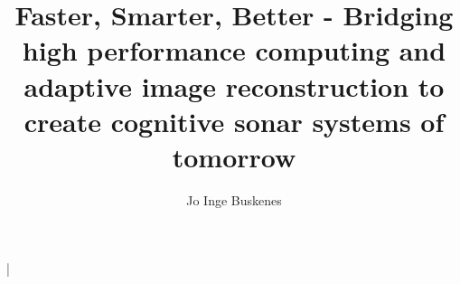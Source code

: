 %


\title{Faster, Smarter, Better - Bridging high performance computing and adaptive image reconstruction to create cognitive sonar systems of tomorrow}
\author{Jo Inge Buskenes}





\makeglossaries



%
%


\frontmatter
\maketitle

%   
%   

|
\printglossary 


\mainmatter
% 
%     
%    

%



%

%	 
%	
%
%    
%   

%	 
%	

